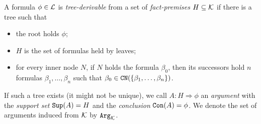 



\begin{definition}
\label{def:ab-arg}
A formula $\phi \in \mathcal{L}$ is \emph{tree-derivable} from a set of \emph{fact-premises} $H \subseteq \mathcal{K}$
if there is a tree such that
\begin{itemize}
    \item the root holds $\phi$;
    \item $H$ is the set of formulas held by leaves;
    \item for every inner node $N$, if $N$ holds the formula $\beta_0$, then its successors hold $n$ formulas $\beta_1, \ldots , \beta_n$ such that $\beta_0 \in \texttt{\textup{CN}}(\{\beta_1, \ldots , \beta_n\})$.
\end{itemize}
If such a tree exists (it might not be unique), we call $A : H \Rightarrow \phi$
an \emph{argument} with the \emph{support set} $\texttt{\textup{Sup}}(A) = H$ and the \emph{conclusion} $\texttt{\textup{Con}}(A) = \phi$. We denote the set of arguments induced from $ \mathcal{K}$ by $\texttt{\textup{Arg}}_{\mathcal{K}}$.



\end{definition}

